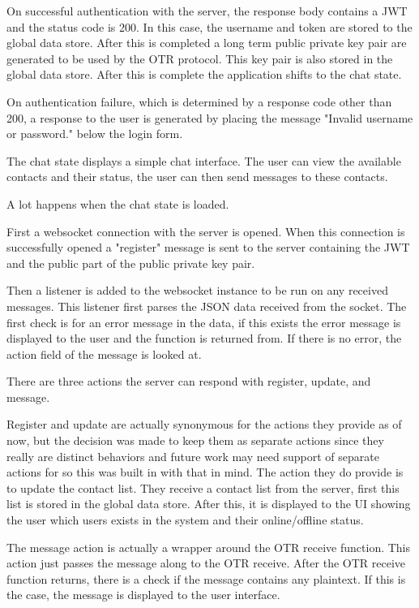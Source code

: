 On successful authentication with the server, the response body contains a JWT and the status code is 200. In this case, the username and token are stored to the global data store. After this is completed a long term public private key pair are generated to be used by the OTR protocol. This key pair is also stored in the global data store. After this is complete the application shifts to the chat state.


On authentication failure, which is determined by a response code other than 200, a response to the user is generated by placing the message "Invalid username or password." below the login form. 


The chat state displays a simple chat interface. The user can view the available contacts and their status, the user can then send messages to these contacts. 


A lot happens when the chat state is loaded. 


First a websocket connection with the server is opened. When this connection is successfully opened a "register" message is sent to the server containing the JWT and the public part of the public private key pair. 


Then a listener is added to the websocket instance to be run on any received messages. This listener first parses the JSON data received from the socket. The first check is for an error message in the data, if this exists the error message is displayed to the user and the function is returned from. If there is no error, the action field of the message is looked at. 


There are three actions the server can respond with register, update, and message.


Register and update are actually synonymous for the actions they provide as of now, but the decision was made to keep them as separate actions since they really are distinct behaviors and future work may need support of separate actions for so this was built in with that in mind. The action they do provide is to update the contact list. They receive a contact list from the server, first this list is stored in the global data store. After this, it is displayed to the UI showing the user which users exists in the system and their online/offline status.


The message action is actually a wrapper around the OTR receive function. This action just passes the message along to the OTR receive. After the OTR receive function returns, there is a check if the message contains any plaintext. If this is the case, the message is displayed to the user interface.


